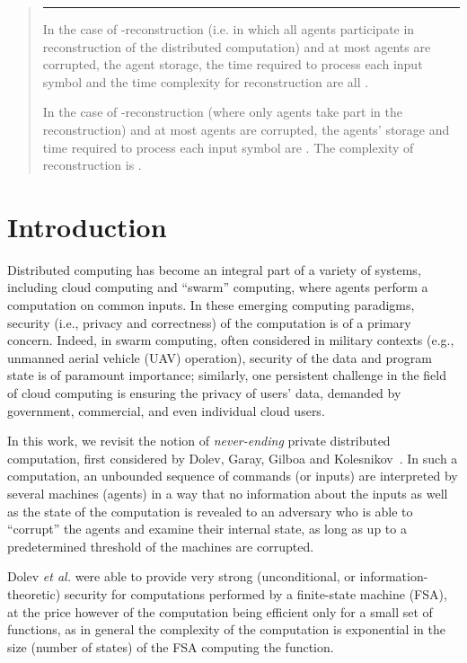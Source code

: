 \documentclass[letterpaper,11pt]{article}
\newlength{\saveparindent}
\newlength{\saveparskip}
\newenvironment{tiret}{\begin{list}{\hspace{1pt}\rule[0.5ex]{6pt}{1pt}\hfill}{\labelwidth=15pt\labelsep=3pt \leftmargin=18pt \topsep=1pt\setlength{\listparindent}{\saveparindent}\setlength{\parsep}{\saveparskip}\setlength{\itemsep}{1pt}}}{\end{list}}
\begin{document}
\begin{titlepage}
\begin{abstract}
\begin{tiret}

\item In the case of -reconstruction (i.e. in which all 
agents participate in reconstruction of the distributed computation) and at most  agents are corrupted,
the agent storage, the time required to process each input symbol and the time complexity for reconstruction are all . 

\item In the case of -reconstruction (where only  agents 
take part in the reconstruction) and at most  agents are corrupted,
the agents' storage and time required to process each input symbol are . The complexity of reconstruction is .

\end{tiret}
\end{abstract}


\end{titlepage}
\clearpage
{} 


\section{Introduction}

Distributed computing has become an integral part of a variety of
systems, including cloud computing and ``swarm'' computing, where 
agents perform a computation
on common inputs.  In these emerging computing paradigms, security
(i.e., privacy and correctness) of the computation is of a primary
concern.  Indeed, in
swarm computing, often considered in military contexts (e.g., unmanned
aerial vehicle (UAV) operation), security 
of the data and program state is of paramount importance;
similarly, one persistent challenge in the field of cloud
computing is ensuring the privacy of users' data, demanded by
government, commercial, and even individual cloud users.

In this work, we revisit the notion of {\em never-ending}
private distributed computation, first considered by Dolev, Garay, Gilboa and
Kolesnikov~\cite{DGGK11}. In such a computation, an unbounded sequence
of commands (or inputs) are interpreted by several machines (agents) in 
a way that no information about the inputs as well as the state of
the computation is revealed to an adversary who is able to ``corrupt''
the agents and examine their internal state, as long as up to a predetermined
threshold of the machines are corrupted.


Dolev {\em et al.}
were able to provide very strong (unconditional, or information-theoretic)
security for computations performed by a finite-state machine (FSA),
at the price however of the computation being efficient only for a small
set of functions, as in general the complexity of the computation
is exponential in the size (number of states) of the FSA computing
the function.
\end{document}
